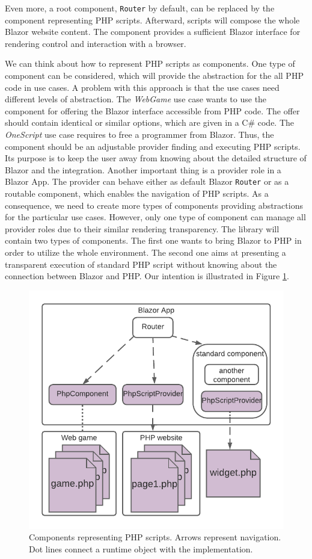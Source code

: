 Even more, a root component, \texttt{Router} by default, can be replaced by the component representing PHP scripts.
Afterward, scripts will compose the whole Blazor website content.
The component provides a sufficient Blazor interface for rendering control and interaction with a browser. 
\par
We can think about how to represent PHP scripts as components.
One type of component can be considered, which will provide the abstraction for the all PHP code in use cases.
A problem with this approach is that the use cases need different levels of abstraction.
The \textit{WebGame} use case wants to use the component for offering the Blazor interface accessible from PHP code.
The offer should contain identical or similar options, which are given in a C\# code.
The \textit{OneScript} use case requires to free a programmer from Blazor.
Thus, the component should be an adjustable provider finding and executing PHP scripts.
Its purpose is to keep the user away from knowing about the detailed structure of Blazor and the integration.
Another important thing is a provider role in a Blazor App.
The provider can behave either as default Blazor \texttt{Router} or as a routable component, which enables the navigation of PHP scripts.
As a consequence, we need to create more types of components providing abstractions for the particular use cases.
However, only one type of component can manage all provider roles due to their similar rendering transparency.
The library will contain two types of components.
The first one wants to bring Blazor to PHP in order to utilize the whole environment.
The second one aims at presenting a transparent execution of standard PHP script without knowing about the connection between Blazor and PHP.
Our intention is illustrated in Figure \ref{img12:component}.
\par
\begin{figure}
\centering
\includegraphics[scale=0.9]{./img/Components}
\caption{Components representing PHP scripts. Arrows represent navigation. 
Dot lines connect a runtime object with the implementation.
}
\label{img12:component}
\end{figure} 
